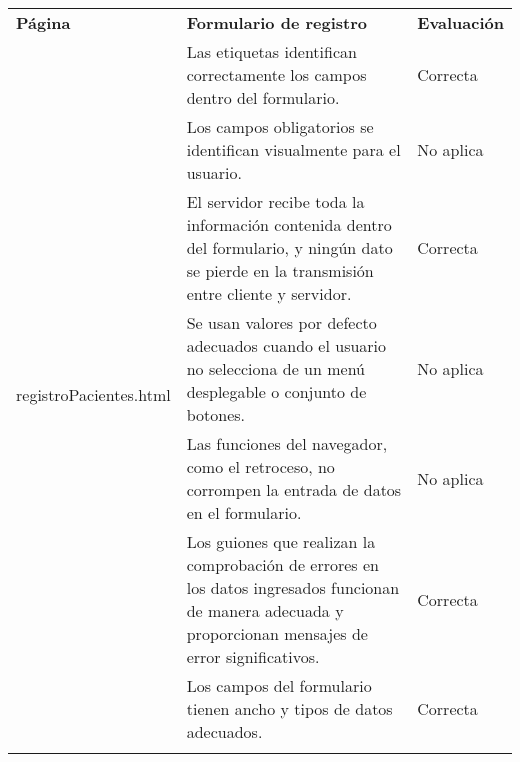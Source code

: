 \begin{table}[htpb]
\centering
\begin{tabularx}{\textwidth}{|l|X|l|}
\hline
\rowcolor[gray]{0.9}\multicolumn{3}{|l|}{\textbf{Anexo PI-006}}                                                                                                                                                                                 \\ \hline
\textbf{Página}                          & \textbf{Formulario de registro}                                                                                                                           & \textbf{Evaluación} \\ \hline
\multirow{10}{*}{registroPacientes.html} & Las etiquetas identifican correctamente los campos dentro del formulario.                                                                                 & Correcta            \\ \cline{2-3} 
                                         & Los campos obligatorios se identifican visualmente para el usuario.                                                                                       & No aplica           \\ \cline{2-3} 
                                         & El servidor recibe toda la información contenida dentro del formulario, y ningún dato se pierde en la transmisión entre cliente y servidor.               & Correcta            \\ \cline{2-3} 
                                         & Se usan valores por defecto adecuados cuando el usuario no selecciona de un menú desplegable o conjunto de botones.                                       & No aplica           \\ \cline{2-3} 
                                         & Las funciones del navegador, como el retroceso, no corrompen la entrada de datos en el formulario.                                                        & No aplica           \\ \cline{2-3} 
                                         & Los guiones que realizan la comprobación de errores en los datos ingresados funcionan de manera adecuada y proporcionan mensajes de error significativos. & Correcta            \\ \cline{2-3} 
                                         & Los campos del formulario tienen ancho y tipos de datos adecuados.                                                                                        & Correcta            \\ \cline{2-3} 

\end{tabularx}
\end{table}
